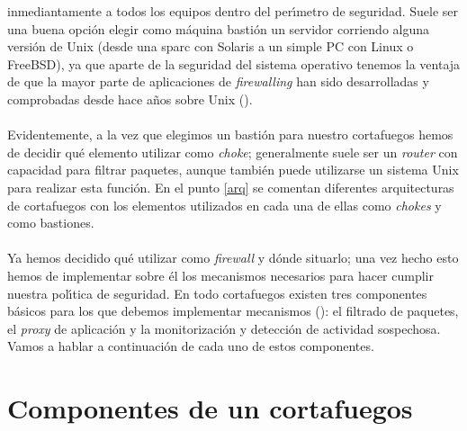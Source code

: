 inmediantamente a todos los equipos dentro del per\'{\i}metro de seguridad.
Suele ser una buena opci\'on elegir como m\'aquina basti\'on un servidor 
corriendo alguna versi\'on de Unix (desde una {\sc sparc} con Solaris a un 
simple PC con Linux o FreeBSD), ya que aparte de la seguridad del sistema 
operativo tenemos la ventaja de que la mayor parte de aplicaciones de {\it
firewalling} han sido desarrolladas y comprobadas desde hace a\~nos sobre Unix 
(\cite{kn:rob94}).\\
\\Evidentemente, a la vez que elegimos un basti\'on para nuestro cortafuegos
hemos de decidir qu\'e elemento utilizar como {\it choke}; generalmente suele 
ser un {\it router} con capacidad para filtrar paquetes, aunque tambi\'en puede
utilizarse un sistema Unix para realizar esta funci\'on. En el punto \ref{arq}
se comentan diferentes arquitecturas de cortafuegos con los elementos utilizados
en cada una de ellas como {\it chokes} y como bastiones.\\
\\Ya hemos decidido qu\'e utilizar como {\it firewall} y d\'onde situarlo;
una vez hecho esto hemos de implementar sobre 
\'el los mecanismos necesarios para hacer cumplir nuestra pol\'{\i}tica de 
seguridad. En todo cortafuegos existen tres componentes b\'asicos para los que 
debemos implementar mecanismos (\cite{kn:open}): el filtrado de paquetes, el 
{\it proxy} de aplicaci\'on y la monitorizaci\'on y detecci\'on de actividad 
sospechosa. Vamos a hablar a continuaci\'on de cada uno de estos componentes.
\section{Componentes de un cortafuegos}
